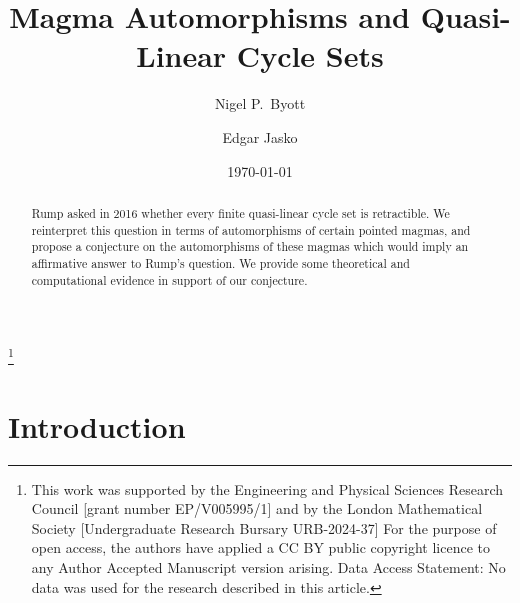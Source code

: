 \documentclass[letterpaper,12pt]{amsart}
\numberwithin{equation}{section}
\numberwithin{algorithm}{section}
\theoremstyle{definition}
\begin{document}
	\title{Magma Automorphisms and Quasi-Linear Cycle Sets}
	
	\author{Nigel P.~Byott}
	\address{Department of Mathematics \& Statistics, University of Exeter, Exeter 
		EX4 4QF, U.K.}  
	
	\author{Edgar Jasko}
	\address{Department of Mathematics, KU Leuven, B-3001 Leuven, Belgium}  
	
	\thanks{This work was supported by the Engineering and Physical Sciences
		Research Council [grant number EP/V005995/1] and by the London Mathematical
		Society [Undergraduate Research Bursary URB-2024-37]  \newline 
		\indent
		For the purpose of open access, the authors have applied a CC BY public
		copyright licence  to any Author Accepted Manuscript version arising. \newline 
		\indent
		Data Access Statement: No data was used for the research described in this
		article.}
	
	
	\date{\today}
	
	
	
\begin{abstract}
		
Rump asked in 2016 whether every finite quasi-linear cycle set is
retractible. We reinterpret this question in terms of automorphisms of certain
pointed magmas, and propose a conjecture on the automorphisms of these magmas
which would imply an affirmative answer to Rump's question. We provide some theoretical and
computational evidence in support of our conjecture.
\end{abstract}
	
\maketitle
	
	
\section{Introduction}
\end{document}
